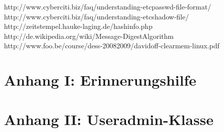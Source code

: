 \documentclass[twoside]{article}
\begin{document}
\begin{thebibliography}{1}
 http://www.cyberciti.biz/faq/understanding-etcpasswd-file-format/
 http://www.cyberciti.biz/faq/understanding-etcshadow-file/
 http://zeitstempel.hauke-laging.de/hashinfo.php
 http://de.wikipedia.org/wiki/Message-Digest\textunderscore Algorithm
 http://www.foo.be/course/dess-20082009/davidoff-clearmem-linux.pdf
\end{thebibliography}

\newpage
\section*{Anhang I: Erinnerungshilfe}
\label{gen}

\newpage
\section*{Anhang II: Useradmin-Klasse}
\label{admin}
\end{document}
